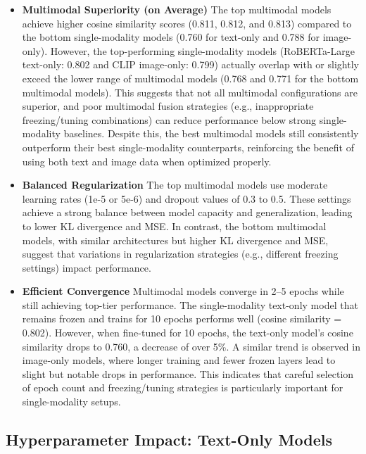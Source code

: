 \begin{itemize}
    \item \textbf{Multimodal Superiority (on Average)}
    The top multimodal models achieve higher cosine similarity scores (0.811, 0.812, and 0.813) compared to the bottom single-modality models (0.760 for text-only and 0.788 for image-only). However, the top-performing single-modality models (RoBERTa-Large text-only: 0.802 and CLIP image-only: 0.799) actually overlap with or slightly exceed the lower range of multimodal models (0.768 and 0.771 for the bottom multimodal models). This suggests that not all multimodal configurations are superior, and poor multimodal fusion strategies (e.g., inappropriate freezing/tuning combinations) can reduce performance below strong single-modality baselines. Despite this, the best multimodal models still consistently outperform their best single-modality counterparts, reinforcing the benefit of using both text and image data when optimized properly.

    \item \textbf{Balanced Regularization}
    The top multimodal models use moderate learning rates (1e-5 or 5e-6) and dropout values of 0.3 to 0.5. These settings achieve a strong balance between model capacity and generalization, leading to lower KL divergence and MSE. In contrast, the bottom multimodal models, with similar architectures but higher KL divergence and MSE, suggest that variations in regularization strategies (e.g., different freezing settings) impact performance.

    \item \textbf{Efficient Convergence}
    Multimodal models converge in 2–5 epochs while still achieving top-tier performance. The single-modality text-only model that remains frozen and trains for 10 epochs performs well (cosine similarity = 0.802). However, when fine-tuned for 10 epochs, the text-only model's cosine similarity drops to 0.760, a decrease of over 5\%. A similar trend is observed in image-only models, where longer training and fewer frozen layers lead to slight but notable drops in performance. This indicates that careful selection of epoch count and freezing/tuning strategies is particularly important for single-modality setups.
\end{itemize}




\subsection{Hyperparameter Impact: Text-Only Models}
\label{subsec:text-hparams}

